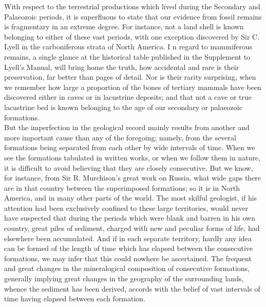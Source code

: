 \indent With respect to the terrestrial productions which lived during the Secondary and Palaeozoic periods, it is superfluous to state that our evidence from fossil remains is fragmentary in an extreme degree. For instance, not a land shell is known belonging to either of these vast periods, with one exception discovered by Sir C. Lyell in the carboniferous strata of North America. I n regard to mammiferous remains, a single glance at the historical table published in the Supplement to Lyell's Manual, will bring home the truth, how accidental and rare is their preservation, far better than pages of detail. Nor is their rarity surprising, when we remember how large a proportion of the bones of tertiary mammals have been discovered either in caves or in lacustrine deposits; and that not a cave or true lacustrine bed is known belonging to the age of our secondary or palaeozoic formations.\\
\indent But the imperfection in the geological record mainly results from another and more important cause than any of the foregoing; namely, from the several formations being separated from each other by wide intervals of time. When we see the formations tabulated in written works, or when we follow them in nature, it is difficult to avoid believing that they are closely consecutive. But we know, for instance, from Sir R. Murchison's great work on Russia, what wide gaps there are in that country between the superimposed formations; so it is in North America, and in many other parts of the world. The most skilful geologist, if his attention had been exclusively confined to these large territories, would never have suspected that during the periods which were blank and barren in his own country, great piles of sediment, charged with new and peculiar forms of life, had elsewhere been accumulated. And if in each separate territory, hardly any idea can be formed of the length of time which has elapsed between the consecutive formations, we may infer that this could nowhere be ascertained. The frequent and great changes in the mineralogical composition of consecutive formations, generally implying great changes in the geography of the surrounding lands, whence the sediment has been derived, accords with the belief of vast intervals of time having elapsed between each formation.\\
